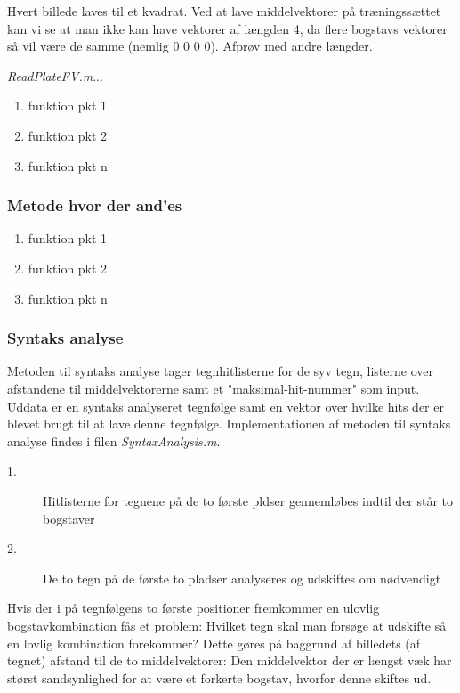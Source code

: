 Hvert billede laves til et kvadrat. Ved at lave middelvektorer på træningssættet kan vi se at man ikke kan have vektorer af længden 4, da flere bogstavs vektorer så vil være de samme (nemlig 0 0 0 0). Afprøv med andre længder.

\textit{ReadPlateFV.m}...

\begin{enumerate}
\item funktion pkt 1
\item funktion pkt 2
\item funktion pkt n
\end{enumerate}

\subsubsection{Metode hvor der and'es}

\begin{enumerate}
\item funktion pkt 1
\item funktion pkt 2
\item funktion pkt n
\end{enumerate}

\subsubsection{Syntaks analyse}

Metoden til syntaks analyse tager tegnhitlisterne for de syv tegn, listerne over afstandene til middelvektorerne samt et "maksimal-hit-nummer" som input. Uddata er en syntaks analyseret tegnfølge samt en vektor over hvilke hits der er blevet brugt til at lave denne tegnfølge. Implementationen af metoden til syntaks analyse findes i filen \textit{SyntaxAnalysis.m}.

\begin{description}
\item[1.] Hitlisterne for tegnene på de to første pldser gennemløbes indtil der står to bogstaver
\item[2.] De to tegn på de første to pladser analyseres og udskiftes om nødvendigt
\end{description}

Hvis der i på tegnfølgens to første positioner fremkommer en ulovlig bogstavkombination fås et problem: Hvilket tegn skal man forsøge at udskifte så en lovlig kombination forekommer? Dette gøres på baggrund af billedets (af tegnet) afstand til de to middelvektorer: Den middelvektor der er længst væk har størst sandsynlighed for at være et forkerte bogstav, hvorfor denne skiftes ud.

